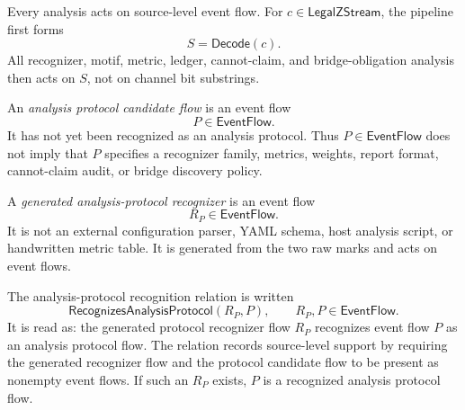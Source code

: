\begin{principle}
\label{prin:analysis-pipeline-decode-first}
Every analysis acts on source-level event flow. For $c\in\mathsf{LegalZStream}$, the pipeline first forms
$$
  S=\mathsf{Decode}(c).
$$
All recognizer, motif, metric, ledger, cannot-claim, and bridge-obligation analysis then acts on $S$, not on channel bit substrings.
\end{principle}

\begin{definition}
\label{def:analysis-pipeline-protocol-candidate}
An \emph{analysis protocol candidate flow} is an event flow
$$
  P\in\mathsf{EventFlow}.
$$
It has not yet been recognized as an analysis protocol. Thus $P\in\mathsf{EventFlow}$ does not imply that $P$ specifies a recognizer family, metrics, weights, report format, cannot-claim audit, or bridge discovery policy.
\end{definition}

\begin{definition}
\label{def:analysis-pipeline-protocol-recognizer}
A \emph{generated analysis-protocol recognizer} is an event flow
$$
  R_P\in\mathsf{EventFlow}.
$$
It is not an external configuration parser, YAML schema, host analysis script, or handwritten metric table. It is generated from the two raw marks and acts on event flows.
\end{definition}

\begin{definition}
\label{def:analysis-pipeline-protocol-recognition}
The analysis-protocol recognition relation is written
$$
  \mathsf{RecognizesAnalysisProtocol}(R_P,P),
  \qquad
  R_P,P\in\mathsf{EventFlow}.
$$
It is read as: the generated protocol recognizer flow $R_P$ recognizes event flow $P$ as an analysis protocol flow. The relation records source-level support by requiring the generated recognizer flow and the protocol candidate flow to be present as nonempty event flows. If such an $R_P$ exists, $P$ is a recognized analysis protocol flow.
\end{definition}

